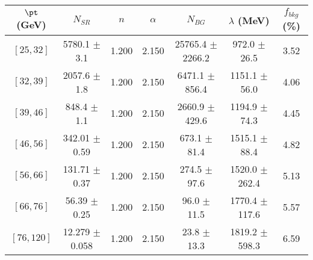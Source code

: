\begin{tabular}{c||c|c|c|c|c||c}
$\pt$ (GeV) & $N_{SR}$ & $n$ & $\alpha$ & $N_{BG}$  & $\lambda$ (MeV) & $f_{bkg}$ (\%) \\
\hline
$[25, 32]$ & 5780.1 $\pm$ 3.1 & 1.200 & 2.150 & 25765.4 $\pm$ 2266.2 & 972.0 $\pm$ 26.5 & 3.52\\
$[32, 39]$ & 2057.6 $\pm$ 1.8 & 1.200 & 2.150 & 6471.1 $\pm$ 856.4 & 1151.1 $\pm$ 56.0 & 4.06\\
$[39, 46]$ & 848.4 $\pm$ 1.1 & 1.200 & 2.150 & 2660.9 $\pm$ 429.6 & 1194.9 $\pm$ 74.3 & 4.45\\
$[46, 56]$ & 342.01 $\pm$ 0.59 & 1.200 & 2.150 & 673.1 $\pm$ 81.4 & 1515.1 $\pm$ 88.4 & 4.82\\
$[56, 66]$ & 131.71 $\pm$ 0.37 & 1.200 & 2.150 & 274.5 $\pm$ 97.6 & 1520.0 $\pm$ 262.4 & 5.13\\
$[66, 76]$ & 56.39 $\pm$ 0.25 & 1.200 & 2.150 & 96.0 $\pm$ 11.5 & 1770.4 $\pm$ 117.6 & 5.57\\
$[76, 120]$ & 12.279 $\pm$ 0.058 & 1.200 & 2.150 & 23.8 $\pm$ 13.3 & 1819.2 $\pm$ 598.3 & 6.59\\
\end{tabular}
